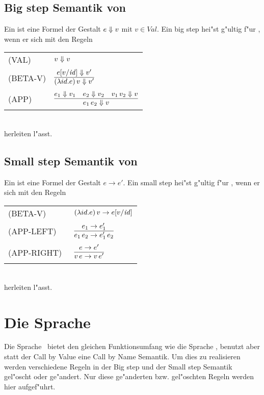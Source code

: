 \subsection{Big step Semantik von \LZERO}

Ein  ist eine Formel der Gestalt $e \Downarrow v$ mit $v \in Val$. Ein big step hei"st g"ultig f"ur \LZERO, wenn
er sich mit den Regeln\\[5mm]
  \begin{tabular}{ll}
     \mbox{(VAL)}         & $v \Downarrow v$ \\[3mm]
     \mbox{(BETA-V)}      & $\regel{e[v/\id] \eval v'}
                                   {(\abstr{id}{e})\,v \eval v'}$ \\[5mm]
     \mbox{(APP)}         & $\regel{e_1 \eval v_1 \quad e_2 \eval v_2 \quad v_1\,v_2 \eval v}
                                   {e_1\,e_2 \eval v}$
  \end{tabular}\\[7mm]
herleiten l"asst.


\subsection{Small step Semantik von \LZERO}

Ein  ist eine Formel der Gestalt $e \to e'$. Ein small step hei"st g"ultig f"ur \LZERO, wenn er sich mit den
Regeln\\[5mm]
   \begin{tabular}{ll}
     \mbox{(BETA-V)}      & $(\lambda id.e)\,v \to e[v/{\text{\it id\/}}]$ \\[5mm]
     \mbox{(APP-LEFT)}    & $\regel{e_1\to e'_1}
                               {e_1\,e_2 \to e'_1\,e_2}$ \\[3mm]
     \mbox{(APP-RIGHT)\ } & $\regel{e \to e'}
                                  {v\,e \to v\,e'}$
\end{tabular}\\[7mm]
herleiten l"asst.



\section{Die Sprache \LZEROCBN}

Die Sprache \LZEROCBN \ bietet den gleichen Funktionsumfang wie die Sprache \LZERO, benutzt aber statt der 
Call by Value eine Call by Name Semantik. Um dies zu realisieren werden verschiedene Regeln in der Big step 
und der Small step Semantik gel"oscht oder ge"andert. Nur diese ge"anderten bzw. gel"oschten Regeln werden hier
aufgef"uhrt.

